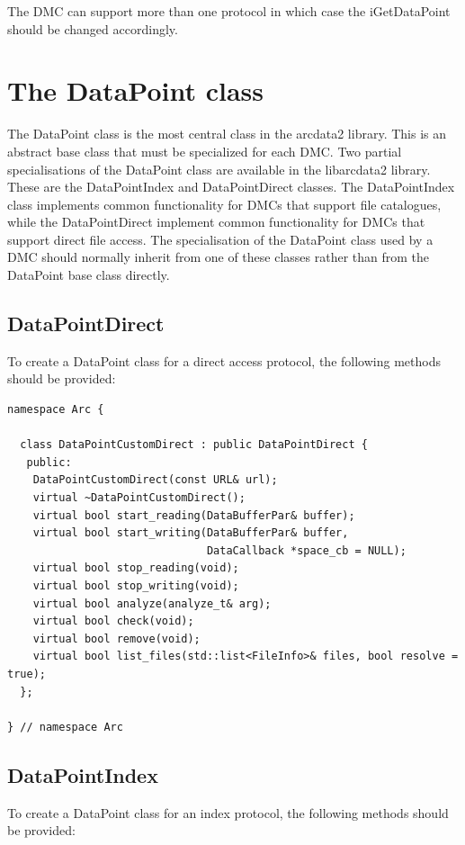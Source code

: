 \documentclass{book}
\begin{document}
The DMC can support more than one protocol in which case the
iGetDataPoint should be changed accordingly.

\chapter{The DataPoint class}
\label{sec:DataPoint}

The DataPoint class is the most central class in the arcdata2
library. This is an abstract base class that must be specialized for
each DMC. Two partial specialisations of the DataPoint class are
available in the libarcdata2 library. These are the DataPointIndex and
DataPointDirect classes. The DataPointIndex class implements common
functionality for DMCs that support file catalogues, while the
DataPointDirect implement common functionality for DMCs that support
direct file access. The specialisation of the DataPoint class used by
a DMC should normally inherit from one of these classes rather than
from the DataPoint base class directly.

\section{DataPointDirect}

To create a DataPoint class for a direct access protocol, the
following methods should be provided:

\begin{verbatim}
namespace Arc {

  class DataPointCustomDirect : public DataPointDirect {
   public:
    DataPointCustomDirect(const URL& url);
    virtual ~DataPointCustomDirect();
    virtual bool start_reading(DataBufferPar& buffer);
    virtual bool start_writing(DataBufferPar& buffer,
                               DataCallback *space_cb = NULL);
    virtual bool stop_reading(void);
    virtual bool stop_writing(void);
    virtual bool analyze(analyze_t& arg);
    virtual bool check(void);
    virtual bool remove(void);
    virtual bool list_files(std::list<FileInfo>& files, bool resolve = true);
  };

} // namespace Arc
\end{verbatim}

\section{DataPointIndex}

To create a DataPoint class for an index protocol, the following
methods should be provided:
\end{document}
